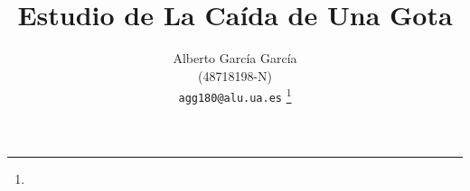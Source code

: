 \documentclass[journal]{IEEEtran}
\begin{document}
%
\title{Estudio de La Caída de Una Gota}
%
%
%

\author{Alberto García García\\ (48718198-N)\\ \texttt{agg180@alu.ua.es} %
\thanks{}%
}

% 
%



%
{}
% 
\end{document}
